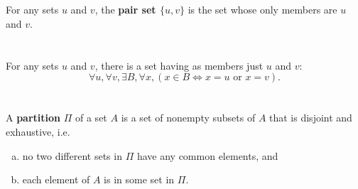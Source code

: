 \documentclass{report}
\begin{document}
\begin{definition}


\end{definition}

\section{}%
\label{ref:pair-set}

For any sets $u$ and $v$, the \textbf{pair set $\{u, v\}$} is the set whose
  only members are $u$ and $v$.

\begin{definition}

  \statementpadding



\end{definition}

\section{}%
\label{ref:pairing-axiom}

For any sets $u$ and $v$, there is a set having as members just $u$ and $v$:
  $$\forall u, \forall v, \exists B, \forall x,
      (x \in B \iff x = u \text{ or } x = v).$$

\begin{axiom}

  \statementpadding



\end{axiom}

\section{}%
\label{ref:partition}

A \textbf{partition} $\Pi$ of a set $A$ is a set of nonempty subsets of $A$ that
  is disjoint and exhaustive, i.e.
  \begin{enumerate}[(a)]
    \item no two different sets in $\Pi$ have any common elements, and
    \item each element of $A$ is in some set in $\Pi$.
  \end{enumerate}
\end{document}
